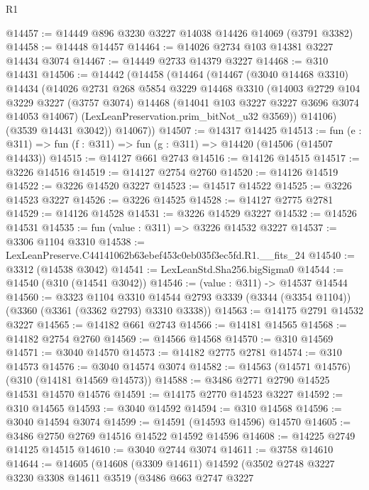\begin{lexlean}{R1}
\begin{coremodule}
@14457 := @14449 @896 @3230 @3227 @14038 @14426 @14069 (@3791 @3382)
@14458 := @14448 @14457
@14464 := @14026 @2734 @103 @14381 @3227 @14434 @3074
@14467 := @14449 @2733 @14379 @3227
@14468 := @310 @14431
@14506 := @14442
    (@14458
      (@14464
        (@14467
          (@3040 @14468 @3310)
          @14434
          (@14026
            @2731
            @268
            @5854
            @3229
            @14468
            @3310
            (@14003
              @2729
              @104
              @3229
              @3227
              (@3757 @3074)
              @14468
              (@14041 @103 @3227 @3227 @3696 @3074 @14053 @14067)
              (LexLeanPreservation.prim_bitNot_u32 @3569))
            @14106)
          (@3539 @14431 @3042))
        @14067))
@14507 := @14317 @14425
@14513 := fun (e : @311) => fun (f : @311) => fun (g : @311) => @14420 (@14506 (@14507 @14433))
@14515 := @14127 @661 @2743
@14516 := @14126 @14515
@14517 := @3226 @14516
@14519 := @14127 @2754 @2760
@14520 := @14126 @14519
@14522 := @3226 @14520 @3227
@14523 := @14517 @14522
@14525 := @3226 @14523 @3227
@14526 := @3226 @14525
@14528 := @14127 @2775 @2781
@14529 := @14126 @14528
@14531 := @3226 @14529 @3227
@14532 := @14526 @14531
@14535 := fun (value : @311) => @3226 @14532 @3227
@14537 := @3306 @1104 @3310
@14538 := LexLeanPreserve.C44141062b63ebef453c0eb035f3ec5fd.R1.__fits_24
@14540 := @3312 (@14538 @3042)
@14541 := LexLeanStd.Sha256.bigSigma0
@14544 := @14540 (@310 (@14541 @3042))
@14546 := (value : @311) -> @14537 @14544
@14560 := @3323
    @1104
    @3310
    @14544
    @2793
    @3339
    (@3344 (@3354 @1104))
    (@3360 (@3361 (@3362 @2793) @3310 @3338))
@14563 := @14175 @2791 @14532 @3227
@14565 := @14182 @661 @2743
@14566 := @14181 @14565
@14568 := @14182 @2754 @2760
@14569 := @14566 @14568
@14570 := @310 @14569
@14571 := @3040 @14570
@14573 := @14182 @2775 @2781
@14574 := @310 @14573
@14576 := @3040 @14574 @3074
@14582 := @14563 (@14571 @14576) (@310 (@14181 @14569 @14573))
@14588 := @3486 @2771 @2790 @14525 @14531 @14570 @14576
@14591 := @14175 @2770 @14523 @3227
@14592 := @310 @14565
@14593 := @3040 @14592
@14594 := @310 @14568
@14596 := @3040 @14594 @3074
@14599 := @14591 (@14593 @14596) @14570
@14605 := @3486 @2750 @2769 @14516 @14522 @14592 @14596
@14608 := @14225 @2749 @14125 @14515
@14610 := @3040 @2744 @3074
@14611 := @3758 @14610
@14644 := @14605
    (@14608
      (@3309 @14611)
      @14592
      (@3502
        @2748
        @3227
        @3230
        @3308
        @14611
        @3519
        (@3486
          @663
          @2747
          @3227

\end{coremodule}
\end{lexlean}
